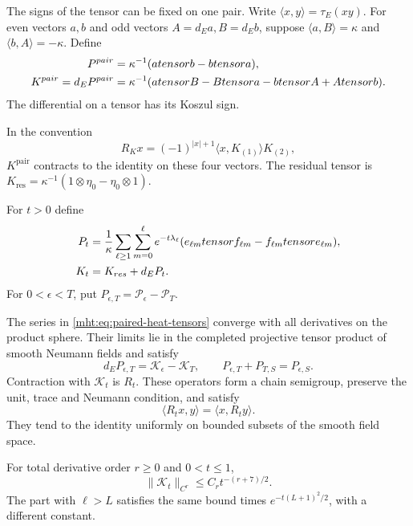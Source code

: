The signs of the tensor can be fixed on one pair. Write
$\langle x,y\rangle=\tau_E(xy)$. For even vectors $a,b$ and odd
vectors $A=d_Ea,B=d_Eb$, suppose
$\langle a,B\rangle=\kappa$ and
$\langle b,A\rangle=-\kappa$. Define
\begin{align}
 P^{\mathrm{pair}}&=\kappa^{-1}(a\otimes b-b\otimes a),\notag\\
 K^{\mathrm{pair}}=d_EP^{\mathrm{pair}}
   &=\kappa^{-1}(a\otimes B-B\otimes a-b\otimes A+A\otimes b).
 \label{mht:eq:heat-pair-signs}
\end{align}
The differential on a tensor has its Koszul sign.

In the convention
\[
 R_Kx=(-1)^{|x|+1}\langle x,K_{(1)}\rangle K_{(2)},
\]
$K^{\mathrm{pair}}$ contracts to the identity on these four vectors.
The residual tensor is
$K_{\mathrm{res}}=\kappa^{-1}(1\otimes\eta_0-\eta_0\otimes1)$.

For $t>0$ define
\begin{align}
 \mathcal P_t&=\frac1\kappa\sum_{\ell\geq1}\sum_{m=0}^{\ell}
   e^{-t\lambda_\ell}
   (e_{\ell m}\otimes f_{\ell m}-f_{\ell m}\otimes e_{\ell m}),
   \notag\\
 \mathcal K_t&=K_{\mathrm{res}}+d_E\mathcal P_t.
 \label{mht:eq:paired-heat-tensors}
\end{align}
For $0<\epsilon<T$, put
$P_{\epsilon,T}=\mathcal P_\epsilon-\mathcal P_T$.

\begin{theorem}\label{mht:thm:paired-heat}
The series in \eqref{mht:eq:paired-heat-tensors} converge with
all derivatives on the product sphere. Their limits lie in the
completed projective tensor product of smooth Neumann fields and
satisfy
\begin{equation}\label{mht:eq:coefficient-heat-ward}
 d_EP_{\epsilon,T}=\mathcal K_\epsilon-\mathcal K_T,
 \qquad P_{\epsilon,T}+P_{T,S}=P_{\epsilon,S}.
\end{equation}
Contraction with $\mathcal K_t$ is $R_t$. These operators form a
chain semigroup, preserve the unit, trace and Neumann condition,
and satisfy
\[
 \langle R_tx,y\rangle=\langle x,R_ty\rangle.
\]
They tend to the identity uniformly on bounded subsets of the
smooth field space.

For total derivative order $r\geq0$ and
$0<t\leq1$,
\begin{equation}\label{mht:eq:heat-tensor-bound}
 \|\mathcal K_t\|_{C^r}\leq C_rt^{-(r+7)/2}.
\end{equation}
The part with $\ell>L$ satisfies the same bound times
$e^{-t(L+1)^2/2}$, with a different constant.
\end{theorem}

